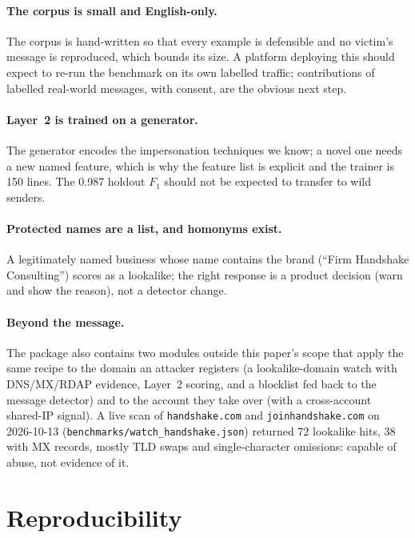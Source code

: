 \documentclass[10pt,twocolumn]{article}
\newcommand{\code}[1]{\texttt{#1}}
\begin{document}
\paragraph{The corpus is small and English-only.} The corpus is hand-written so that every example is defensible and no victim's message is reproduced, which bounds its size. A platform deploying this should expect to re-run the benchmark on its own labelled traffic; contributions of labelled real-world messages, with consent, are the obvious next step.

\paragraph{Layer~2 is trained on a generator.} The generator encodes the impersonation techniques we know; a novel one needs a new named feature, which is why the feature list is explicit and the trainer is 150 lines. The 0.987 holdout $F_1$ should not be expected to transfer to wild senders.

\paragraph{Protected names are a list, and homonyms exist.} A legitimately named business whose name contains the brand (``Firm Handshake Consulting'') scores as a lookalike; the right response is a product decision (warn and show the reason), not a detector change.

\paragraph{Beyond the message.} The package also contains two modules outside this paper's scope that apply the same recipe to the domain an attacker registers (a lookalike-domain watch with DNS/MX/RDAP evidence, Layer~2 scoring, and a blocklist fed back to the message detector) and to the account they take over (with a cross-account shared-IP signal). A live scan of \code{handshake.com} and \code{joinhandshake.com} on 2026-10-13 (\code{benchmarks/watch\_handshake.json}) returned 72 lookalike hits, 38 with MX records, mostly TLD swaps and single-character omissions: capable of abuse, not evidence of it.

\section{Reproducibility}
\label{sec:repro}
\end{document}
